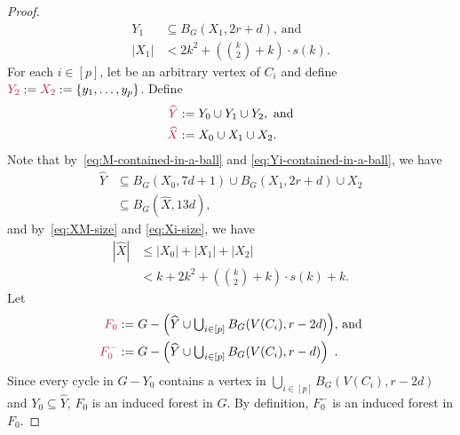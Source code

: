 \documentclass{patmorin}
\begin{document}
\begin{proof}
\begin{align}
Y_1&\subseteq B_G(X_1,2r+d)\text{, and} \label{eq:Yi-contained-in-a-ball}\\
|X_1|&<\textstyle  2k^2+ (\binom{k}{2}+k)\cdot s(k). \label{eq:Xi-size}
\end{align}
For each $i\in[p]$, let  be an arbitrary vertex of $C_i$ and define $\mathdefin{Y_2}:=\mathdefin{X_2}:=\{y_1,\ldots,y_p\}$.
Define
\begin{align*}
  \mathdefin{\widehat{Y}}&:= \textstyle Y_0 \cup Y_1 \cup Y_2,\ \textrm{and}\\
  \mathdefin{\widehat{X}}&:=\textstyle X_0\cup X_1\cup X_2.
\end{align*}
Note that by~\eqref{eq:M-contained-in-a-ball} and \eqref{eq:Yi-contained-in-a-ball}, we have
\begin{equation}\label{m_in_x_ball}
\begin{split}
\widehat{Y}&\textstyle\subseteq B_G(X_0,7d+1) \cup B_G(X_1,2r+d) \cup X_2\\
&\subseteq B_G(\widehat{X}, 13d),
\end{split}
\end{equation}
and by~\eqref{eq:XM-size} and \eqref{eq:Xi-size},  we have
\begin{equation}
\begin{split}
|\widehat{X}|& \textstyle \leq |X_0| + |X_1| + |X_2|  \\
&\textstyle< k + 2k^2+(\binom{k}{2}+k)\cdot s(k) + k. %
\end{split} \label{x_prime_size}
\end{equation}
Let
\begin{align*}
\mathdefin{F_0}&:=\textstyle{G-\left(\widehat{Y}\cup \bigcup_{i\in[p]} B_G(V(C_i),r-2d)\right)}\text{, and}\\
\mathdefin{F^-_0}&:=\textstyle{G-\left(\widehat{Y}\cup \bigcup_{i\in[p]} B_G(V(C_i),r-d)\right)} \enspace .
\end{align*}
Since every cycle in $G-Y_0$ contains a vertex in $\bigcup_{i\in[p]} B_G(V(C_i),r-2d)$ and $Y_0\subseteq \widehat{Y}$, $F_0$ is an induced forest in $G$. By definition, $F^-_0$  is an induced forest in $F_0$.


\end{proof}
\end{document}
